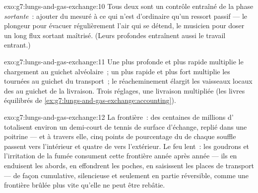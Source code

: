 \begin{solution}{exo:g7:lungs-and-gas-exchange:10}
Tous deux sont un contrôle entraîné de la phase \emph{sortante}~:
ajouter du  mesuré à ce qui n'est d'ordinaire qu'un ressort
passif --- le plongeur pour évacuer régulièrement l'air qui se
détend, le musicien pour doser un long flux sortant maîtrisé. (Leurs
 profondes entraînent aussi le travail entrant.)
\end{solution}

\begin{solution}{exo:g7:lungs-and-gas-exchange:11}
Une  plus profonde et plus rapide multiplie le chargement
au guichet alvéolaire~; un  plus rapide et plus fort multiplie
les tournées au guichet du transport~; le réacheminement élargit les
vaisseaux locaux des  au guichet de la livraison. Trois
réglages, une livraison multipliée (les livres équilibrés de
\cref{ex:g7:lungs-and-gas-exchange:accounting}).
\end{solution}

\begin{solution}{exo:g7:lungs-and-gas-exchange:12}
La frontière~: des centaines de millions d' totalisent
environ un demi-court de tennis de surface d'échange, replié dans
une poitrine --- et à travers elle, cinq points de pourcentage du
 de chaque souffle passent vers l'intérieur et quatre de
 vers l'extérieur. Le feu lent~: les goudrons et
l'irritation de la fumée consument cette frontière année après année
--- ils en enduisent les abords, en effondrent les poches, en
saisissent les places de transport --- de façon cumulative,
silencieuse et seulement en partie réversible, comme une frontière
brûlée plus vite qu'elle ne peut être rebâtie.
\end{solution}

